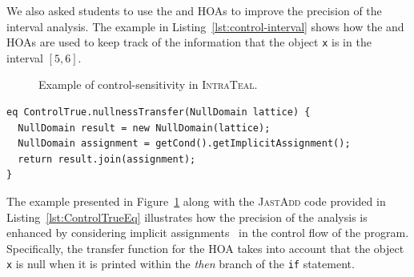 We also asked students to use the  and 
HOAs to improve the precision of the interval analysis. The example in
Listing~\ref{lst:control-interval} shows how the  and 
HOAs are used to keep track of the information that the object \texttt{x} is in the interval $[5,6]$.
\begin{figure}
	\centering
	\caption{\label{fig:ExampleTEAL} Example of control-sensitivity in \textsc{IntraTeal}.}
\end{figure}
\begin{lstlisting}[language=JastAdd,label={lst:ControlTrueEq}, caption={Transfer function for \astnode{ControlTrue} HOA.}]
eq ControlTrue.nullnessTransfer(NullDomain lattice) {
  NullDomain result = new NullDomain(lattice);
  NullDomain assignment = getCond().getImplicitAssignment();
  return result.join(assignment);
}
\end{lstlisting}
The example presented in Figure~\ref{fig:ExampleTEAL} along with the \textsc{JastAdd} code
provided in Listing~\ref{lst:ControlTrueEq} illustrates how the precision of the
analysis is enhanced by considering implicit assignments~\cite{spa} in the control flow of
the program. Specifically, the transfer function for the  HOA
takes into account that the object \texttt{x} is null when it is printed within
the \emph{then} branch of the \texttt{if} statement.


